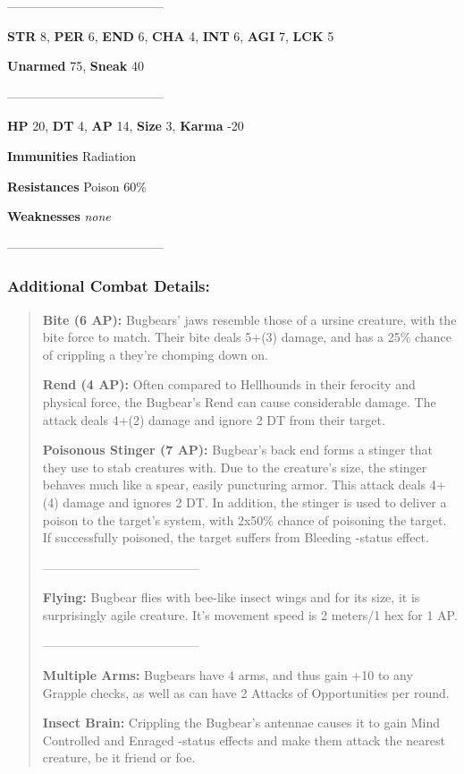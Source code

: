 \documentclass[11pt,a4paper,twocolumn]{book}
\begin{document}
		--------------------------------------
		
		\noindent
		\textbf{STR} 8, \textbf{PER} 6, \textbf{END} 6, \textbf{CHA} 4, \textbf{INT} 6, \textbf{AGI} 7, \textbf{LCK} 5
		
		\noindent
		\textbf{Unarmed} 75, \textbf{Sneak} 40
		
		--------------------------------------
		
		\noindent
		\textbf{HP} 20, \textbf{DT} 4, \textbf{AP} 14, \textbf{Size} 3, \textbf{Karma} -20
		
		
		\noindent
		\textbf{Immunities} Radiation
		
		\noindent
		\textbf{Resistances} Poison 60\%
		
		\noindent
		\textbf{Weaknesses} \emph{none} %
		
		--------------------------------------
	
	
	\subsubsection*{Additional Combat Details:}
	\begin{verse}
		\textbf{Bite (6 AP):} Bugbears' jaws resemble those of a ursine creature, with the bite force to match. Their bite deals 5+(3) damage, and has a 25\% chance of crippling a they're chomping down on.
		
		\textbf{Rend (4 AP):} Often compared to Hellhounds in their ferocity and physical force, the Bugbear's Rend can cause considerable damage. The attack deals 4+(2) damage and ignore 2 DT from their target.
		
		\textbf{Poisonous Stinger (7 AP):} Bugbear's back end forms a stinger that they use to stab creatures with. Due to the creature's size, the stinger behaves much like a spear, easily puncturing armor. This attack deals 4+(4) damage and ignores 2 DT. In addition, the stinger is used to deliver a poison to the target's system, with 2x50\% chance of poisoning the target. If successfully poisoned, the target suffers from Bleeding -status effect.
		
		--------------------------------------
		
		\textbf{Flying:} Bugbear flies with bee-like insect wings and for its size, it is surprisingly agile creature. It's movement speed is 2 meters/1 hex for 1 AP.
		
		--------------------------------------
		
		\textbf{Multiple Arms:} Bugbears have 4 arms, and thus gain +10 to any Grapple checks, as well as can have 2 Attacks of Opportunities per round.
		
		\textbf{Insect Brain:} Crippling the Bugbear's antennae causes it to gain Mind Controlled and Enraged -status effects and make them attack the nearest creature, be it friend or foe.
		
	\end{verse}
	
\end{document}
